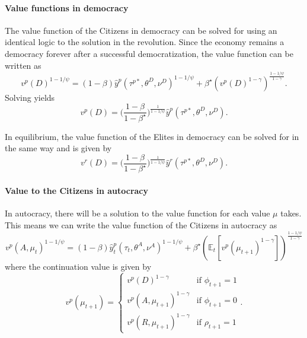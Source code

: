 \documentclass[12pt]{article}
\numberwithin{equation}{section}
\begin{document}
\paragraph{Value functions in democracy}
The value function of the Citizens in democracy can be solved for using an identical logic to the solution in the revolution. Since the economy remains a democracy forever after a successful democratization, the value function can be written as
\begin{equation*}
v^{p}(D)^{1-1/\psi}=(1-\beta)\hat{y}^{p} (\tau^{p*},\theta^{D},\nu^D)^{1-1/\psi}+\beta^{\star}\left(v^{p}(D)^{1-\gamma}\right)^{\frac{1-1/\psi}{1-\gamma}}.
\end{equation*}
Solving yields
\begin{equation*}
v^{p}(D)=\bigg(\frac{1-\beta}{1-\beta^{\star}}\bigg)^{\frac{1}{1-1/\psi}}\hat{y}^{p} (\tau^{p*},\theta^{D},\nu^D).
\end{equation*}

In equilibrium, the value function of the Elites in democracy can be solved for in the same way and is given by
\begin{equation*}
v^{r}(D)=\bigg(\frac{1-\beta}{1-\beta^{\star}}\bigg)^{\frac{1}{1-1/\psi}}\hat{y}^{r} (\tau^{p*},\theta^{D},\nu^D).
\end{equation*}


\paragraph{Value to the Citizens in autocracy}
In autocracy, there will be a solution to the value function for each value $\mu$ takes.  This means we can write the value function of the Citizens in autocracy as
\begin{equation}
	v^{p}(A,\mu_{t})^{1-1/\psi}=(1-\beta)\hat{y}_{t}^{p}(\tau_{t},\theta^{A},\nu^A)^{1-1/\psi}+\beta^{\star}\left(\mathbb{E}_{t}\left[v^p(\mu_{t+1})^{1-\gamma}\right]\right)^{\frac{1-1/\psi}{1-\gamma}}
\end{equation}
where the continuation value is given by
\begin{equation*}
		v^p(\mu_{t+1})=\begin{cases}
v^{p}(D)^{1-\gamma} & \text{if } \phi_{t+1} = 1 \\
v^{p}(A,\mu_{t+1})^{1-\gamma} & \text{if }\phi_{t+1} = 0 \\
v^{p}(R,\mu_{t+1})^{1-\gamma} & \text{if }\rho_{t+1} = 1
\end{cases}.
\end{equation*}
\end{document}
